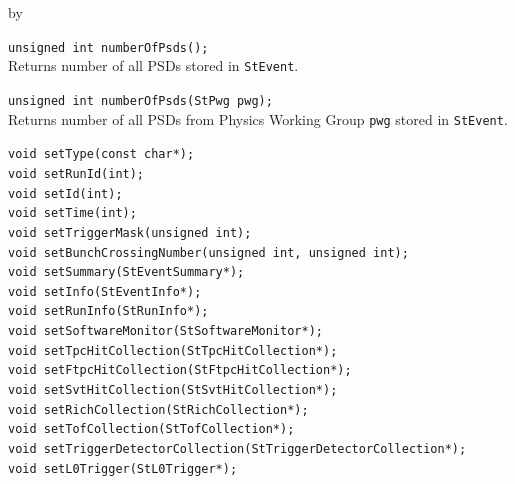 \documentclass[twoside]{article}
\newcommand{\entrylabel}[1]{\mbox{\textbf{{#1}}}\hfil}%
\newenvironment{entry}
{\begin{list}{}%
    {\renewcommand{\makelabel}{\entrylabel}%
     \setlength{\labelwidth}{90pt}%
     \setlength{\leftmargin}{\labelwidth}
     \advance\leftmargin by \labelsep%
      }%
    }%
  {\end{list}}
\newcommand{\Entrylabel}[1]%
{\raisebox{0pt}[1ex][0pt]{\makebox[\labelwidth][l]%
    {\parbox[t]{\labelwidth}{\hspace{0pt}\textbf{{#1}}}}}}
\newenvironment{Entry}%
{\renewcommand{\entrylabel}{\Entrylabel}\begin{entry}}%
  {\end{entry}}
\begin{document}
\begin{Entry}
    \verb+unsigned int numberOfPsds();+\\
    Returns number of all PSDs stored in \texttt{StEvent}.

    \verb+unsigned int numberOfPsds(StPwg pwg);+\\ 
    Returns number of all PSDs from Physics Working Group \texttt{pwg} stored in \texttt{StEvent}.

    \verb+void setType(const char*);+\\

    \verb+void setRunId(int);+\\

    \verb+void setId(int);+\\

    \verb+void setTime(int);+\\

    \verb+void setTriggerMask(unsigned int);+\\

    \verb+void setBunchCrossingNumber(unsigned int, unsigned int);+\\

    \verb+void setSummary(StEventSummary*);+\\

    \verb+void setInfo(StEventInfo*);+\\
    
    \verb+void setRunInfo(StRunInfo*);+\\

    \verb+void setSoftwareMonitor(StSoftwareMonitor*);+\\

    \verb+void setTpcHitCollection(StTpcHitCollection*);+\\

    \verb+void setFtpcHitCollection(StFtpcHitCollection*);+\\

    \verb+void setSvtHitCollection(StSvtHitCollection*);+\\

    \verb+void setRichCollection(StRichCollection*);+\\

    \verb+void setTofCollection(StTofCollection*);+\\

    \verb+void setTriggerDetectorCollection(StTriggerDetectorCollection*);+\\

    \verb+void setL0Trigger(StL0Trigger*);+\\
    

\end{Entry}
\end{document}
